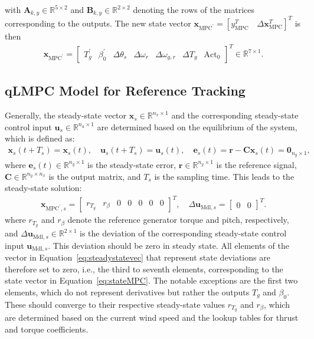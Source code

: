 with $\bm{A}_{k,y} \in \mathbb{R}^{5 \times 2}$ and $\bm{B}_{k,y} \in \mathbb{R}^{2 \times 2}$ denoting the rows of the matrices corresponding to the outputs. The new state vector $\bm{x}_{\text{MPC}^\prime} = [y_{\text{MPC}}^T \quad \Delta  \bm{x}_{\text{MPC}}^T]^T$ is then
\begin{align} \label{eq:stateMPC}
    \bm{x}_{\text{MPC}^\prime} = \begin{bmatrix}T_g^{\prime} & \beta_0^{\prime} & \Delta \theta_s  & \Delta \omega_r & \Delta \omega_{g,r} & \Delta T_g & \text{Act}_0 \end{bmatrix}^T \in \mathbb{R}^{7 \times 1}.
\end{align}
%
\subsection{qLMPC Model for Reference Tracking}
Generally, the steady-state vector $\bm{x}_{s} \in \mathbb{R}^{n_x \times 1}$ and the corresponding steady-state control input $\bm{u}_{s} \in \mathbb{R}^{n_u \times 1}$ are determined based on the equilibrium of the system, which is defined as:
\begin{align*}
    \bm{x}_{s}(t + T_s) = \bm{x}_{s}(t),  \quad \bm{u}_{s}(t + T_s) = \bm{u}_{s}(t), \quad
    \bm{e}_s(t) = \bm{r} - \bm{C} \bm{x}_{s}(t) = \bm{0}_{n_y \times 1}, 
\end{align*}
%
where $\bm{e}_s(t) \in \mathbb{R}^{n_y \times 1}$ is the steady-state error, $\bm{r} \in \mathbb{R}^{n_y \times 1}$ is the reference signal, $\bm{C} \in \mathbb{R}^{n_y \times n_x}$ is the output matrix, and $T_s$ is the sampling time. This leads to the steady-state solution:
\begin{align} \label{eq:steadystatevec}
    \bm{x}_{\text{MPC}^\prime,s} =  \begin{bmatrix} r_{T_g} & r_{\beta} & 0 & 0 & 0 & 0 & 0 \end{bmatrix}^T, \quad
    \Delta{\bm{u}}_{\text{Mdl},s} = \begin{bmatrix} 0 & 0 \end{bmatrix}^T.
\end{align}
where \(r_{T_g}\) and \(r_{\beta}\) denote the reference generator torque and pitch, respectively, and $\Delta{\bm{u}}_{\text{Mdl},s} \in \mathbb{R}^{2 \times 1}$ is the deviation of the corresponding steady-state control input $\bm{u}_{\text{Mdl},s}$. This deviation should be zero in steady state. All elements of the vector in Equation~\eqref{eq:steadystatevec} that represent state deviations are therefore set to zero, i.e., the third to seventh elements, corresponding to the state vector in Equation~\eqref{eq:stateMPC}.  
The notable exceptions are the first two elements, which do not represent derivatives but rather the outputs \( T_g \) and \( \beta_0 \). These should converge to their respective steady-state values \( r_{T_g} \) and \( r_{\beta} \), which are determined based on the current wind speed and the lookup tables for thrust and torque coefficients.


